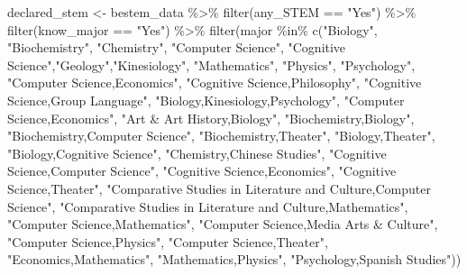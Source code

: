 \documentclass[
]{article}
\newenvironment{Shaded}{\begin{snugshade}}{\end{snugshade}}
\newcommand{\FunctionTok}[1]{\textcolor[rgb]{0.00,0.00,0.00}{#1}}
\newcommand{\NormalTok}[1]{#1}
\newcommand{\OtherTok}[1]{\textcolor[rgb]{0.56,0.35,0.01}{#1}}
\newcommand{\SpecialCharTok}[1]{\textcolor[rgb]{0.00,0.00,0.00}{#1}}
\newcommand{\StringTok}[1]{\textcolor[rgb]{0.31,0.60,0.02}{#1}}
\begin{document}
\begin{Shaded}
\begin{Highlighting}[]
\NormalTok{declared\_stem }\OtherTok{\textless{}{-}}\NormalTok{ bestem\_data }\SpecialCharTok{\%\textgreater{}\%} 
  \FunctionTok{filter}\NormalTok{(any\_STEM }\SpecialCharTok{==} \StringTok{"Yes"}\NormalTok{) }\SpecialCharTok{\%\textgreater{}\%} 
  \FunctionTok{filter}\NormalTok{(know\_major }\SpecialCharTok{==} \StringTok{"Yes"}\NormalTok{) }\SpecialCharTok{\%\textgreater{}\%} 
  \FunctionTok{filter}\NormalTok{(major }\SpecialCharTok{\%in\%} \FunctionTok{c}\NormalTok{(}\StringTok{"Biology"}\NormalTok{, }\StringTok{"Biochemistry"}\NormalTok{, }\StringTok{"Chemistry"}\NormalTok{, }\StringTok{"Computer Science"}\NormalTok{, }\StringTok{"Cognitive   Science"}\NormalTok{,}\StringTok{"Geology"}\NormalTok{,}\StringTok{"Kinesiology"}\NormalTok{, }\StringTok{"Mathematics"}\NormalTok{, }\StringTok{"Physics"}\NormalTok{, }\StringTok{"Psychology"}\NormalTok{, }\StringTok{"Computer Science,Economics"}\NormalTok{, }\StringTok{"Cognitive Science,Philosophy"}\NormalTok{, }\StringTok{"Cognitive Science,Group Language"}\NormalTok{, }\StringTok{"Biology,Kinesiology,Psychology"}\NormalTok{, }\StringTok{"Computer Science,Economics"}\NormalTok{, }\StringTok{"Art \& Art History,Biology"}\NormalTok{,}
\StringTok{"Biochemistry,Biology"}\NormalTok{, }\StringTok{"Biochemistry,Computer Science"}\NormalTok{, }\StringTok{"Biochemistry,Theater"}\NormalTok{,}
\StringTok{"Biology,Theater"}\NormalTok{, }\StringTok{"Biology,Cognitive Science"}\NormalTok{, }\StringTok{"Chemistry,Chinese Studies"}\NormalTok{, }\StringTok{"Cognitive Science,Computer Science"}\NormalTok{, }\StringTok{"Cognitive Science,Economics"}\NormalTok{, }\StringTok{"Cognitive Science,Theater"}\NormalTok{, }\StringTok{"Comparative Studies in Literature and Culture,Computer Science"}\NormalTok{, }\StringTok{"Comparative Studies in Literature and Culture,Mathematics"}\NormalTok{, }\StringTok{"Computer Science,Mathematics"}\NormalTok{, }\StringTok{"Computer Science,Media Arts \& Culture"}\NormalTok{,}
\StringTok{"Computer Science,Physics"}\NormalTok{, }\StringTok{"Computer Science,Theater"}\NormalTok{, }\StringTok{"Economics,Mathematics"}\NormalTok{, }\StringTok{"Mathematics,Physics"}\NormalTok{, }\StringTok{"Psychology,Spanish Studies"}\NormalTok{))}


\end{Highlighting}
\end{Shaded}
\end{document}
